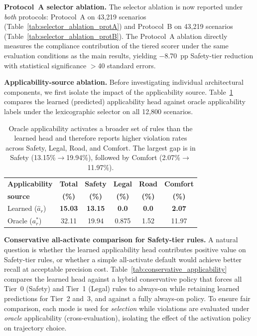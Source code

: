 \noindent\textbf{Protocol~A selector ablation.}  The selector ablation is now reported under \emph{both} protocols: Protocol~A on 43{,}219 scenarios (Table~\ref{tab:selector_ablation_protA}) and Protocol~B on 43{,}219 scenarios (Table~\ref{tab:selector_ablation_protB}).  The Protocol~A ablation directly measures the compliance contribution of the tiered scorer under the same evaluation conditions as the main results, yielding $-$8.70~pp Safety-tier reduction with statistical significance $>$40 standard errors.

\noindent\textbf{Applicability-source ablation.}  Before investigating individual architectural components, we first isolate the impact of the applicability source.  Table~\ref{tab:applicability_ablation} compares the learned (predicted) applicability head against oracle applicability labels under the lexicographic selector on all 12{,}800 scenarios.

\begin{table}[t]
\centering
\caption{Applicability-Source Ablation: Oracle vs.\ Learned (12{,}800 Scenarios, Lexicographic Selection)}
\label{tab:applicability_ablation}
\setlength{\tabcolsep}{3pt}
\begin{tabular}{lccccc}
\toprule
\textbf{Applicability} & \textbf{Total} & \textbf{Safety} & \textbf{Legal} & \textbf{Road} & \textbf{Comfort} \\
\textbf{source} & \textbf{(\%)} & \textbf{(\%)} & \textbf{(\%)} & \textbf{(\%)} & \textbf{(\%)} \\
\midrule
Learned ($\hat{a}_r$)  & \textbf{15.03} & \textbf{13.15} & \textbf{0.0} & \textbf{0.0} & \textbf{2.07} \\
Oracle ($a_r^*$)       & 32.11 & 19.94 & 0.875 & 1.52 & 11.97 \\
\bottomrule
\end{tabular}
\vspace{1mm}
\caption*{\footnotesize Oracle applicability activates a broader set of rules than the learned head and therefore reports higher violation rates across Safety, Legal, Road, and Comfort.  The largest gap is in Safety (13.15\%$\to$19.94\%), followed by Comfort (2.07\%$\to$11.97\%).}
\end{table}

\noindent\textbf{Conservative all-activate comparison for Safety-tier rules.}  A natural question is whether the learned applicability head contributes positive value on Safety-tier rules, or whether a simple all-activate default would achieve better recall at acceptable precision cost.  Table~\ref{tab:conservative_applicability} compares the learned head against a hybrid conservative policy that forces all Tier~0 (Safety) and Tier~1 (Legal) rules to always-on while retaining learned predictions for Tier~2 and~3, and against a fully always-on policy.  To ensure fair comparison, each mode is used for \emph{selection} while violations are evaluated under \emph{oracle} applicability (cross-evaluation), isolating the effect of the activation policy on trajectory choice.

